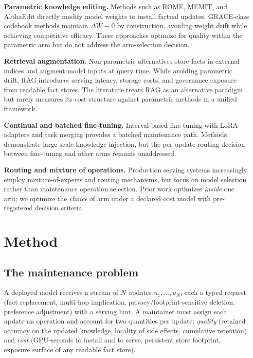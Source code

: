 \documentclass[preprint,12pt]{elsarticle}
\begin{document}
\textbf{Parametric knowledge editing.} Methods such as ROME, MEMIT, and AlphaEdit
directly modify model weights to install factual updates. GRACE-class codebook
methods maintain $\Delta W \equiv 0$ by construction, avoiding weight drift while
achieving competitive efficacy. These approaches optimize for quality within the
parametric arm but do not address the arm-selection decision.

\textbf{Retrieval augmentation.} Non-parametric alternatives store facts in external
indices and augment model inputs at query time. While avoiding parametric drift, RAG
introduces serving latency, storage costs, and governance exposure from readable fact
stores. The literature treats RAG as an alternative paradigm but rarely measures its
cost structure against parametric methods in a unified framework.

\textbf{Continual and batched fine-tuning.} Interval-based fine-tuning with LoRA
adapters and task merging provides a batched maintenance path. Methods demonstrate
large-scale knowledge injection, but the per-update routing decision between
fine-tuning and other arms remains unaddressed.

\textbf{Routing and mixture of operations.} Production serving systems increasingly
employ mixture-of-experts and routing mechanisms, but focus on model selection rather
than maintenance operation selection. Prior work optimizes \emph{inside} one arm; we
optimize the \emph{choice} of arm under a declared cost model with pre-registered
decision criteria.

\section{Method}
\label{sec:method}

\subsection{The maintenance problem}
A deployed model receives a stream of $N$ updates $u_1,\dots,u_N$, each a typed
request (fact replacement, multi-hop implication, privacy/footprint-sensitive
deletion, preference adjustment) with a serving hint. A maintainer must assign each
update an operation and account for two quantities per update: \emph{quality}
(retained accuracy on the updated knowledge, locality of side effects, cumulative
retention) and \emph{cost} (GPU-seconds to install and to serve, persistent store
footprint, exposure surface of any readable fact store).
\end{document}
